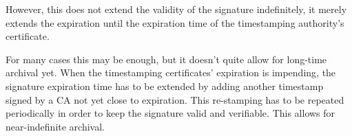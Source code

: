 However, this does not extend the validity of the signature indefinitely,
it merely extends the expiration until the expiration time of the timestamping authority's certificate.

For many cases this may be enough, but it doesn't quite allow for long-time archival yet.
When the timestamping certificates' expiration is impending,
the signature expiration time has to be extended by adding another timestamp signed by a \gls{CA} not yet close to expiration.
This re-stamping has to be repeated periodically in order to keep the signature valid and verifiable.
This allows for near-indefinite archival.

